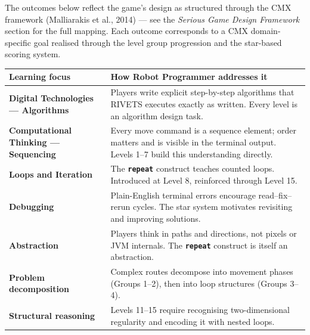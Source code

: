 \documentclass[12pt,a4paper]{article}
\newcommand{\keyword}[1]{\textcolor{keyword}{\texttt{\bfseries #1}}}
\begin{document}
The outcomes below reflect the game's design as structured through the CMX framework (Malliarakis et al., 2014) --- see the \emph{Serious Game Design Framework} section for the full mapping. Each outcome corresponds to a CMX domain-specific goal realised through the level group progression and the star-based scoring system.

\vspace{6pt}

\begin{tcolorbox}[gddbox, title={Learning Outcomes Mapped to Core Curriculum}]
\begin{tabularx}{\linewidth}{>{\bfseries\sffamily\color{primary}}p{4cm} X}
  \toprule
  Learning focus & How Robot Programmer addresses it \\
  \midrule
  \textbf{Digital Technologies --- Algorithms} &
    Players write explicit step-by-step algorithms that RIVETS executes exactly as written. Every level is an algorithm design task. \\
  \textbf{Computational Thinking --- Sequencing} &
    Every move command is a sequence element; order matters and is visible in the terminal output. Levels 1--7 build this understanding directly. \\
  \textbf{Loops and Iteration} &
    The \keyword{repeat} construct teaches counted loops. Introduced at Level 8, reinforced through Level 15. \\
  \textbf{Debugging} &
    Plain-English terminal errors encourage read--fix--rerun cycles. The star system motivates revisiting and improving solutions. \\
  \textbf{Abstraction} &
    Players think in paths and directions, not pixels or JVM internals. The \keyword{repeat} construct is itself an abstraction. \\
  \textbf{Problem decomposition} &
    Complex routes decompose into movement phases (Groups 1--2), then into loop structures (Groups 3--4). \\
  \textbf{Structural reasoning} &
    Levels 11--15 require recognising two-dimensional regularity and encoding it with nested loops. \\
  \bottomrule
\end{tabularx}
\end{tcolorbox}

\vspace{6pt}
\end{document}
